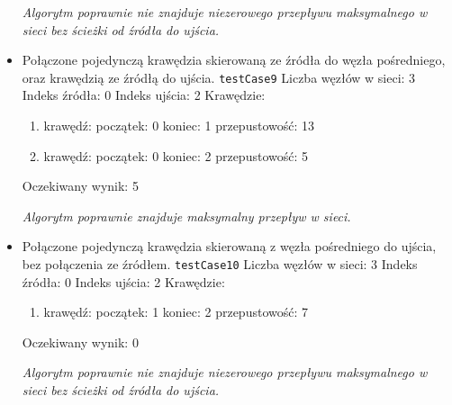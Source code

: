 \begin{itemize}[nosep]
    \emph{Algorytm poprawnie nie znajduje niezerowego
    przepływu maksymalnego w sieci bez ścieżki od źródła do ujścia.}

    \item Połączone pojedynczą krawędzia skierowaną ze źródła do węzła
    pośredniego, oraz krawędzią ze źródłą do ujścia.
    \texttt{testCase9}
    Liczba węzłów w sieci: 3
    Indeks źródła: 0
    Indeks ujścia: 2
    Krawędzie:
    \begin{enumerate}[nosep]
        \item krawędź:
        początek: 0
        koniec: 1
        przepustowość: 13
        \item krawędź:
        początek: 0
        koniec: 2
        przepustowość: 5
    \end{enumerate}
    Oczekiwany wynik: 5

    \emph{Algorytm poprawnie znajduje maksymalny
    przepływ w sieci.}

    \item Połączone pojedynczą krawędzia skierowaną z węzła pośredniego do
    ujścia, bez połączenia ze źródłem.
    \texttt{testCase10}
    Liczba węzłów w sieci: 3
    Indeks źródła: 0
    Indeks ujścia: 2
    Krawędzie:
    \begin{enumerate}[nosep]
        \item krawędź:
        początek: 1
        koniec: 2
        przepustowość: 7
    \end{enumerate}
    Oczekiwany wynik: 0

    \emph{Algorytm poprawnie nie znajduje niezerowego
    przepływu maksymalnego w sieci bez ścieżki od źródła do ujścia.}
\end{itemize}


